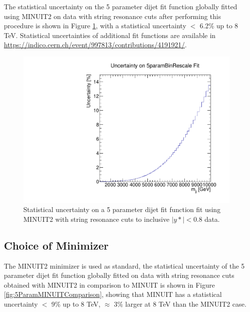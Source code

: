 The statistical uncertainty on the 5 parameter dijet fit function globally fitted using MINUIT2 on data with string resonance cuts after performing this procedure is shown in Figure \ref{fig:5ParamStatisticalUncertainty}, with a statistical uncertainty $ < $ 6.2\% up to 8 TeV. Statistical uncertainties of additional fit functions are available in \\ {\href{https://indico.cern.ch/event/997813/contributions/4191921/attachments/2178521/3679266/dijet_CompareBinRescale_26_01_2021.pdf}{https://indico.cern.ch/event/997813/contributions/4191921/}}.

\begin{figure}
    \centering
    \includegraphics[width=1\linewidth]{figures/app-GlobalFitStudies/5ParamGlobalFit_ystar0p8_Uncertainty.pdf}
    \caption{Statistical uncertainty on a 5 parameter dijet fit function fit using MINUIT2 with string resonance cuts to inclusive $|y*|<0.8$ data.}
    \label{fig:5ParamStatisticalUncertainty}
\end{figure}

\subsection{Choice of Minimizer}
The MINUIT2 minimizer is used as standard, the statistical uncertainty of the 5 parameter dijet fit function globally fitted on data with string resonance cuts obtained with MINUIT2 in comparison to MINUIT is shown in Figure \ref{fig:5ParamMINUITComparison}, showing that MINUIT has a statistical uncertainty $ < $ 9\% up to 8 TeV, $\approx$ 3\% larger at 8 TeV than the MINUIT2 case.

